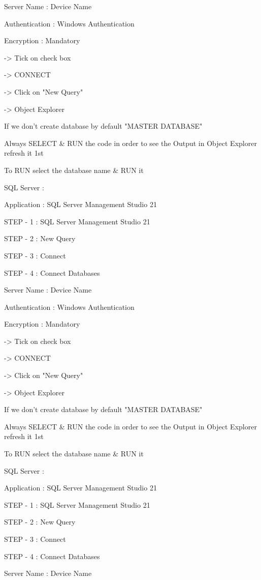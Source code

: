 Server Name : Device Name

Authentication : Windows Authentication

Encryption : Mandatory

-> Tick on check box

-> CONNECT

-> Click on "New Query"

-> Object Explorer


If we don't create database by default "MASTER DATABASE"


Always SELECT & RUN the code in order to see the Output in Object Explorer refresh it 1st


To RUN select the database name & RUN it

SQL Server :

Application : SQL Server Management Studio 21

STEP - 1 : SQL Server Management Studio 21

STEP - 2 : New Query

STEP - 3 : Connect

STEP - 4 : Connect Databases


Server Name : Device Name

Authentication : Windows Authentication

Encryption : Mandatory

-> Tick on check box

-> CONNECT

-> Click on "New Query"

-> Object Explorer


If we don't create database by default "MASTER DATABASE"


Always SELECT & RUN the code in order to see the Output in Object Explorer refresh it 1st


To RUN select the database name & RUN it

SQL Server :

Application : SQL Server Management Studio 21

STEP - 1 : SQL Server Management Studio 21

STEP - 2 : New Query

STEP - 3 : Connect

STEP - 4 : Connect Databases


Server Name : Device Name

